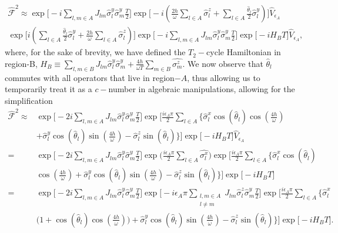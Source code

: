 \documentclass[12pt]{iopart}
\begin{document}
\begin{multline}	
    \hat{\mathcal{F}}^2 	\approx\exp\Bigg[-i \sum_{l,m\in A}J_{lm} \hat{\sigma}^y_l\hat{\sigma}^y_m\frac{T}{2}\Bigg] \exp\Bigg[-i\left(\frac{2h}{\omega } \sum_{l\in A}^{}\hat{\sigma}^z_l + \sum_{l \in A}\frac{\hat{\theta}_{l}}{2}\hat{\sigma}^y_l\right)\Bigg] 
    \hat{V}_{\epsilon_A} \\
    \exp\Bigg[i \left(\sum_{l \in A}\frac{\hat{\theta}_{l}}{2}\hat{\sigma}^y_l + \frac{2h}{\omega} \sum_{l\in A}^{}\hat{\sigma}^z_l\right)\Bigg] \exp\Bigg[-i\sum_{l,m\in A}J_{lm} \hat{\sigma}^y_l\hat{\sigma}^y_m\frac{T}{2}\Bigg] \exp\big[-i H_B T\big]\hat{V}_{\epsilon_A},\nonumber
\end{multline}
where, for the sake of brevity, we have defined the $T_2-$cycle Hamiltonian in region-B, $\displaystyle {H}_B \equiv \sum_{l,m\in B} J_{lm} \hat{\sigma}^y_l\hat{\sigma}^y_m + \frac{4h}{\omega T}\sum_{m \in B}\hat{\sigma^z_m}$. We now observe that $\hat{\theta}_l$ commutes with all operators that live in region$-A$, thus allowing us to temporarily treat it as a $c-$number in algebraic manipulations, allowing for the simplification
\begin{align}		
    \hat{\mathcal{F}}^2 	\approx& \exp\Bigg[-2i  \sum_{l,m\in A}J_{lm} \hat{\sigma}^y_l\hat{\sigma}^y_m\frac{T}{2}\Bigg]\exp\Bigg[\frac{i \epsilon_A \pi}{2}\sum_{l\in A}\Bigg\{\hat{\sigma}^x_l \cos(\hat{\theta}_l)\cos(\frac{4h}{\omega})\nonumber\\
    &+ \hat{\sigma}^y_l \cos(\hat{\theta}_l)\sin(\frac{4h}{\omega})-\hat{\sigma}^z_l \sin(\hat{\theta}_l)\Bigg\}\Bigg] \exp\big[-i H_B T\big]\hat{V}_{\epsilon_A}\nonumber\\
    =&\exp\Bigg[-2i \sum_{l,m\in A}J_{lm} \hat{\sigma}_l^y\hat{\sigma}_m^y\frac{T}{2}\Bigg] \exp\Big(\frac{i\epsilon_A \pi}{2}\sum_{l\in A}\hat{\sigma^x_l}\Big) \exp\Bigg[\frac{i \epsilon_A \pi}{2}\sum_{l\in A}\Bigg\{\hat{\sigma}^x_l \cos(\hat{\theta}_l)\nonumber\\
    & \cos(\frac{4h}{\omega})+\hat{\sigma}^y_l \cos(\hat{\theta}_l)\sin(\frac{4h}{\omega})-\hat{\sigma}^z_l \sin(\hat{\theta}_l)\Bigg\}\Bigg]\exp\big[-i H_B T\big]\nonumber\\
    =&\exp\Bigg[-2i\sum_{l,m\in A}J_{lm}\hat{\sigma}^y_l\hat{\sigma}^y_m \frac{T}{2}\Bigg] \exp\Bigg[-i\epsilon_A \pi \sum_{\substack{l,m \in A\\l\neq m}}J_{lm} \hat{\sigma}^z_l\hat{\sigma}^y_m\frac{T}{2}\Bigg] 
     \exp\Bigg[\frac{i \epsilon_A \pi}{2}\sum_{l\in A}\Bigg\{\hat{\sigma}^x_l\nonumber\\
     &\Bigg(1+ \cos(\hat{\theta}_l)\cos(\frac{4h}{\omega})\Bigg)
    +\hat{\sigma}^y_l \cos(\hat{\theta}_l)\sin(\frac{4h}{\omega})-\hat{\sigma}^z_l \sin(\hat{\theta}_l)\Bigg\}\Bigg] \exp\big[-i H_B T\big].
\end{align}
\end{document}
